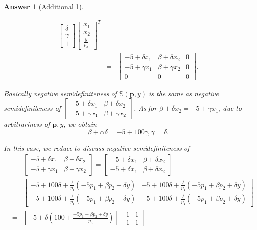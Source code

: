 \documentclass{article}
\newtheorem*{ans}{Answer}
\newcommand{\1}{{\bf 1}}
\newcommand{\bbS}{\mathbb{S}}
\newcommand{\0}{{\mathbf{0}}}
\newcommand{\p}{{\mathbf{p}}}
\newcommand{\<}{\langle}
\renewcommand{\>}{\rangle}
\begin{document}
\begin{ans}[Additional 1]
\begin{enumerate}[(a)]
\begin{eqnarray*}
\begin{bmatrix}
	\delta  \\ \gamma \\ 1
\end{bmatrix} \begin{bmatrix}
x_1 \\ x_2 \\ \frac{y}{p_3}
\end{bmatrix} ^T \\
& = & \begin{bmatrix}
	-5 + \delta x_1  & \beta +\delta  x_2 & 0 \\
	-5 + \gamma x_1 & \beta + \gamma x_2 & 0 \\
	0 & 	  0& 0
\end{bmatrix} .
\end{eqnarray*}

Basically negative semidefiniteness of $\bbS (\p,y)$ is the same as negative semidefiniteness of $ \begin{bmatrix}
-5 + \delta x_1  & \beta +\delta  x_2 \\
-5 + \gamma x_1 & \beta + \gamma x_2 
\end{bmatrix} $. As for $  \beta +\delta  x_2  = -5 + \gamma x_1 $, due to arbitrariness of $\p,y$, we obtain \begin{equation}\beta+ \alpha \delta = -5 + 100 \gamma, \gamma = \delta.
\end{equation}

In this case, we reduce to discuss negative semidefiniteness of 
\begin{eqnarray*}
&& \begin{bmatrix}
-5 + \delta x_1  & \beta +\delta  x_2 \\
-5 + \gamma x_1 & \beta + \gamma x_2 
\end{bmatrix} =  \begin{bmatrix}
	-5 + \delta x_1  & \beta +\delta  x_2 \\
	-5 + \delta x_1 & \beta + \delta x_2 
\end{bmatrix} \\
& =&  \begin{bmatrix}
-5 + 100 \delta+\frac{\delta}{p_3} (-5 p_1 + \beta p_2 + \delta y) & -5 + 100 \delta + \frac{\delta}{p_3} (-5 p_1 + \beta p_2 + \delta y) \\
-5 + 100 \delta + \frac{\delta}{p_3} (-5 p_1 + \beta p_2 + \delta y) & -5 + 100\delta  +  \frac{\delta}{p_3} (-5 p_1 + \beta p_2 + \delta y)
\end{bmatrix} \\
&= & \left[ -5 + \delta \left(100 + \frac{-5 p_1 + \beta p_2 + \delta y}{p_3} \right) \right]  \begin{bmatrix}
1 & 1 \\ 1 & 1
\end{bmatrix} .
\end{eqnarray*}


\end{enumerate}
\end{ans}
\end{document}
